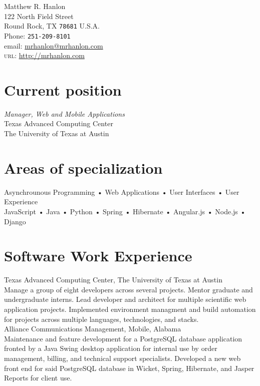 \documentclass[10pt, a4paper]{article}
\newcommand{\years}[1]{\marginnote{\scriptsize #1}}
\begin{document}
{\LARGE Matthew R. Hanlon}\\[.5cm]
122 North Field Street\\
Round Rock, TX \texttt{78681}
U.S.A.\\[.1cm]
Phone: \texttt{251-209-8101}\\[.1cm]
email: \href{mailto:mrhanlon@mrhanlon.com}{mrhanlon@mrhanlon.com}\\
\textsc{url}: \href{http://mrhanlon.com}{http://mrhanlon.com}

\vfill{}

\section*{Current position}
\emph{Manager, Web and Mobile Applications}\\
Texas Advanced Computing Center\\
The University of Texas at Austin

\section*{Areas of specialization}
Asynchrounous Programming • Web Applications • User Interfaces • User Experience\\
JavaScript • Java • Python • Spring • Hibernate • Angular.js • Node.js • Django

\section*{Software Work Experience}
\noindent
\years{2010-present}Texas Advanced Computing Center, The University of Texas at Austin\\
{\small Manage a group of eight developers across several projects. Mentor graduate and undergraduate interns. Lead developer and architect for multiple scientific web application projects. Implemented environment managment and build automation for projects across multiple languages, technologies, and stacks.}\\

\years{2007-2010}Alliance Communications Management, Mobile, Alabama\\
{\small Maintenance and feature development for a PostgreSQL database application fronted by a Java Swing desktop application for internal use by order management, billing, and technical support specialists. Developed a new web front end for said PostgreSQL database in Wicket, Spring, Hibernate, and Jasper Reports for client use.}
\end{document}
